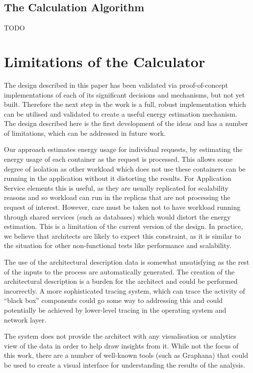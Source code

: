 \subsection{The Calculation Algorithm}

TODO

\section{Limitations of the Calculator}

The design described in this paper has been validated via proof-of-concept implementations of each of its significant decisions and mechanisms, but not yet built.  Therefore the next step in the work is a full, robust implementation which can be utilised and validated to create a useful energy estimation mechanism.
The design described here is the first development of the ideas and has a number of limitations, which can be addressed in future work.

Our approach estimates energy usage for individual requests, by estimating the energy usage of each container as the request is processed.  This allows some degree of isolation as other workload which does not use these containers can be running in the application without it distorting the results.  For Application Service elements this is useful, as they are usually replicated for scalability reasons and so workload can run in the replicas that are not processing the request of interest.  However, care must be taken not to have workload running through shared services (such as databases) which would distort the energy estimation.  This is a limitation of the current version of the design. In practice, we believe that architects are likely to expect this constraint, as it is similar to the situation for other non-functional tests like performance and scalability.

The use of the architectural description data is somewhat unsatisfying as the rest of the inputs to the process are automatically generated.  The creation of the architectural description is a burden for the architect and could be performed incorrectly.  A more sophisticated tracing system, which can trace the activity of “black box” components could go some way to addressing this and could potentially be achieved by lower-level tracing in the operating system and network layer.

The system does not provide the architect with any visualisation or analytics view of the data in order to help draw insights from it.  While not the focus of this work, there are a number of well-known tools (such as Graphana) that could be used to create a visual interface for understanding the results of the analysis.

